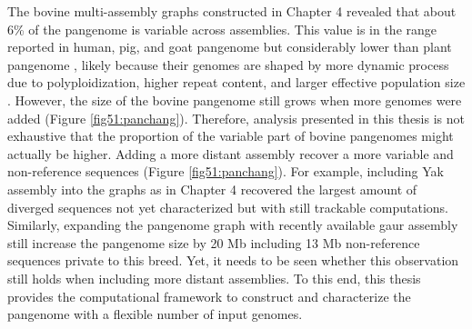 \documentclass[../main.tex]{subfiles}
\begin{document}
The bovine multi-assembly graphs constructed in Chapter 4 revealed that about 6\% of the pangenome is variable across assemblies. This value is in the range reported in human, pig, and goat \citep{li2017comprehensive,li2019towards,duan2019hupan} pangenome but considerably lower than plant pangenome \citep{golicz2016pangenome,gordon2017extensive,gao2019tomato}, likely because their genomes are shaped by more dynamic process due to polyploidization, higher repeat content, and larger effective population size \citep{lei2021plant}. However, the size of the bovine pangenome still grows when more genomes were added (Figure \ref{fig51:panchang}). Therefore, analysis presented in this thesis is not exhaustive that the proportion of the variable part of bovine pangenomes might actually be higher. Adding a more distant assembly recover a more variable and non-reference sequences (Figure \ref{fig51:panchang}). For example, including Yak assembly into the graphs as in Chapter 4 recovered the largest amount  of diverged sequences not yet characterized but with still trackable computations. Similarly, expanding the pangenome graph with recently available gaur assembly still increase the pangenome size by 20 Mb including 13 Mb non-reference sequences private to this breed. Yet, it needs to be seen whether this observation still holds when including more distant assemblies. To this end, this thesis provides the computational framework to construct and characterize the pangenome with a flexible number of input genomes. 
\end{document}
